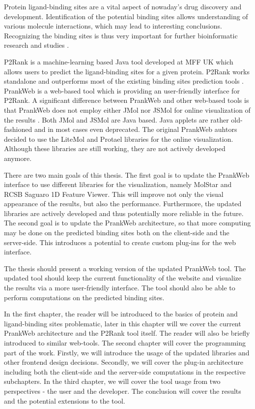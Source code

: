 

Protein ligand-binding sites are a vital aspect of nowaday's drug discovery and development. Identification of the potential binding sites allows understanding of various molecule interactions, which may lead to interesting conclusions. Recognizing the binding sites is thus very important for further bioinformatic research and studies \cite{10.1093/bioinformatics/btt447}.

P2Rank is a machine-learning based Java tool developed at MFF UK which allows users to predict the ligand-binding sites for a given protein. P2Rank works standalone and outperforms most of the existing binding sites prediction tools \cite{krivak2018p2rank}. PrankWeb is a web-based tool which is providing an user-friendly interface for P2Rank. A significant difference between PrankWeb and other web-based tools is that PrankWeb does not employ either JMol nor JSMol for online visualization of the results \cite{jendele2019prankweb}. Both JMol and JSMol are Java based. Java applets are rather old-fashioned and in most cases even deprecated. The original PrankWeb auhtors decided to use the LiteMol and Protael libraries for the online visualization. Although these libraries are still working, they are not actively developed anymore.

There are two main goals of this thesis. The first goal is to update the PrankWeb interface to use different libraries for the visualization, namely MolStar and RCSB Saguaro 1D Feature Viewer. This will improve not only the visual appearance of the results, but also the performance. Furthermore, the updated libraries are actively developed and thus potentially more reliable in the future. The second goal is to update the PrankWeb architecture, so that more computing may be done on the predicted binding sites both on the client-side and the server-side. This introduces a potential to create custom plug-ins for the web interface.

The thesis should present a working version of the updated PrankWeb tool. The updated tool should keep the current functionality of the website and visualize the results via a more user-friendly interface. The tool should also be able to perform computations on the predicted binding sites.

In the first chapter, the reader will be introduced to the basics of protein and ligand-binding sites problematic, later in this chapter will we cover the current PrankWeb architecture and the P2Rank tool itself. The reader will also be briefly introduced to similar web-tools. The second chapter will cover the programming part of the work. Firstly, we will introduce the usage of the updated libraries and other frontend design decisions. Secondly, we will cover the plug-in architecture including both the client-side and the server-side computations in the respective subchapters. In the third chapter, we will cover the tool usage from two perspectives - the user and the developer. The conclusion will cover the results and the potential extensions to the tool.
